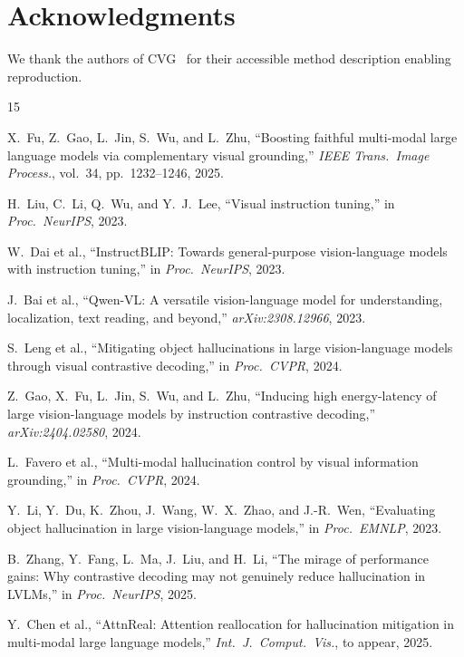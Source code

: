 \documentclass[10pt,twocolumn]{article}
\begin{document}
\section*{Acknowledgments}
We thank the authors of CVG~\cite{fu2025cvg} for their accessible method description enabling reproduction.


\begin{thebibliography}{15}

X.~Fu, Z.~Gao, L.~Jin, S.~Wu, and L.~Zhu,
``Boosting faithful multi-modal large language models via complementary visual grounding,''
\emph{IEEE Trans.\ Image Process.}, vol.~34, pp.~1232--1246, 2025.

H.~Liu, C.~Li, Q.~Wu, and Y.~J.~Lee,
``Visual instruction tuning,''
in \emph{Proc.\ NeurIPS}, 2023.

W.~Dai et al.,
``InstructBLIP: Towards general-purpose vision-language models with instruction tuning,''
in \emph{Proc.\ NeurIPS}, 2023.

J.~Bai et al.,
``Qwen-VL: A versatile vision-language model for understanding, localization, text reading, and beyond,''
\emph{arXiv:2308.12966}, 2023.

S.~Leng et al.,
``Mitigating object hallucinations in large vision-language models through visual contrastive decoding,''
in \emph{Proc.\ CVPR}, 2024.

Z.~Gao, X.~Fu, L.~Jin, S.~Wu, and L.~Zhu,
``Inducing high energy-latency of large vision-language models by instruction contrastive decoding,''
\emph{arXiv:2404.02580}, 2024.

L.~Favero et al.,
``Multi-modal hallucination control by visual information grounding,''
in \emph{Proc.\ CVPR}, 2024.

Y.~Li, Y.~Du, K.~Zhou, J.~Wang, W.~X.~Zhao, and J.-R.~Wen,
``Evaluating object hallucination in large vision-language models,''
in \emph{Proc.\ EMNLP}, 2023.

B.~Zhang, Y.~Fang, L.~Ma, J.~Liu, and H.~Li,
``The mirage of performance gains: Why contrastive decoding may not genuinely reduce hallucination in LVLMs,''
in \emph{Proc.\ NeurIPS}, 2025.

Y.~Chen et al.,
``AttnReal: Attention reallocation for hallucination mitigation in multi-modal large language models,''
\emph{Int.\ J.\ Comput.\ Vis.}, to appear, 2025.


\end{thebibliography}
\end{document}
